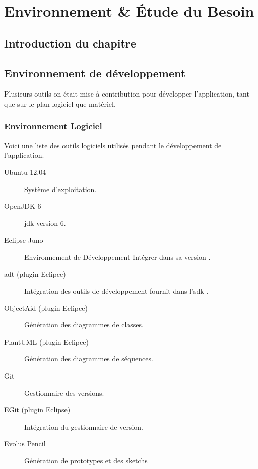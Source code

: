 
\chapter{Environnement \& Étude du Besoin}

\section{Introduction du chapitre}


\section{Environnement de développement}%
Plusieurs outils on était mise à contribution pour développer l'application, tant que sur le plan logiciel que matériel.

\subsection{Environnement Logiciel}
Voici une liste des outils logiciels utilisés pendant le développement de l'application.

\begin{description}

\item [Ubuntu 12.04] Système d'exploitation.\footnotemark[1]

\item [OpenJDK 6] \gls{jdk} version 6.\footnotemark[2]

\item [Eclipse Juno] Environnement de Développement Intégrer dans sa version .\footnotemark[3]

\item [\gls{adt} (plugin Eclipce)] Intégration des outils de développement fournit dans l'\gls{sdk} \android{}.\footnotemark[4]

\item [ObjectAid (plugin Eclipce)] Génération des diagrammes de classes.\footnotemark[5]

\item [PlantUML (plugin Eclipce)] Génération des diagrammes de séquences.\footnotemark[6]

\item [Git] Gestionnaire des versions\footnotemark[7].

\item [EGit (plugin Eclipse)] Intégration du gestionnaire de version.\footnotemark[8]

\item [Evolus Pencil] Génération de prototypes et des sketchs\footnotemark[9]
\end{description}

